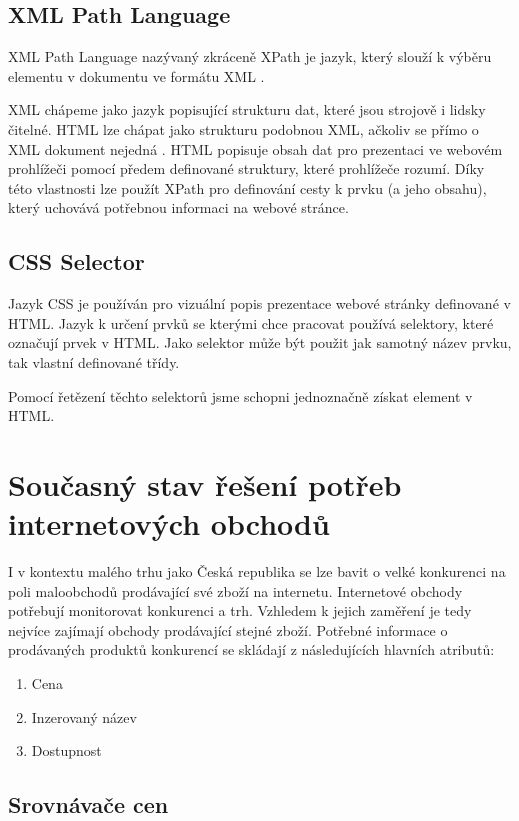\documentclass[thesis=B,czech]{FITthesis}[2012/06/26]
\begin{document}
\subsection{XML Path Language}
XML Path Language\cite{XPath} nazývaný zkráceně XPath je jazyk, který slouží k výběru elementu v dokumentu ve formátu XML\cite{XML} .
\par
XML chápeme jako jazyk popisující strukturu dat, které jsou strojově i lidsky čitelné.
HTML lze chápat jako strukturu podobnou XML, ačkoliv se přímo o XML dokument nejedná \cite{HTML}. HTML popisuje obsah dat pro prezentaci ve webovém prohlížeči pomocí předem definované struktury, které prohlížeče rozumí.
Díky této vlastnosti lze použít XPath pro definování cesty k prvku (a jeho obsahu),
který uchovává potřebnou informaci na webové stránce.
\par
\subsection{CSS Selector}
Jazyk CSS je používán pro vizuální popis prezentace webové stránky definované v HTML. Jazyk k určení prvků se kterými
chce pracovat používá selektory, které označují prvek v HTML. Jako selektor může být použit jak samotný název prvku,
tak vlastní definované třídy.\cite{CSS}
\par
Pomocí řetězení těchto selektorů jsme schopni jednoznačně získat element v HTML.


\section{Současný stav řešení potřeb internetových obchodů}
I v kontextu malého trhu jako Česká republika se lze bavit o velké konkurenci na poli 
maloobchodů prodávající své zboží na internetu.
Internetové obchody potřebují monitorovat konkurenci a trh. Vzhledem k jejich zaměření je tedy nejvíce zajímají 
obchody prodávající stejné zboží. Potřebné informace o prodávaných produktů konkurencí 
se skládají z následujících hlavních atributů:

\begin{enumerate}
\item Cena
\item Inzerovaný název
\item Dostupnost
\end{enumerate}

\subsection{Srovnávače cen}
\end{document}
